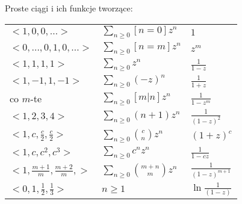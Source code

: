 \entry
Proste ciągi i ich funkcje tworzące:
\begin{tabular}{ | l | l | l |  }
    \hline
    $<1,0,0,\dots>$
      & $\sum_{n \geq 0}[n=0] z^n$
      & $1$ \\
    $<0,\dots, 0,1,0,\dots>$
      & $\sum_{n \geq 0}[n=m] z^n$
      & $z^m$ \\
    $<1,1,1,1>$
      & $\sum_{n \geq 0} z^n$
      & $\frac{1}{1-z}$ \\
    $<1,-1,1,-1>$
      & $\sum_{n \geq 0} (-z)^n$
      & $\frac{1}{1+z}$ \\
    co $m$-te
      & $\sum_{n \geq 0} [m | n]z^n$
      & $\frac{1}{1-z^m}$ \\
    $<1,2,3,4>$
      & $\sum_{n \geq 0} (n+1)z^n$
      & $\frac{1}{(1-z)^2}$ \\
    $<1,c,\frac{c}{2},\frac{c}{2}>$
      & $\sum_{n \geq 0} \binom{c}{n}z^n$
      & $(1+z)^c$ \\
    $<1,c,c^2,c^3>$
      & $\sum_{n \geq 0} c^n z^n$
      & $\frac{1}{1-cz}$ \\
    $<1,\frac{m+1}{m},\frac{m+2}{m},>$
      & $\sum_{n \geq 0} \binom{m+n}{m} z^n$
      & $ \frac{1}{(1-z)^{m+1}}$ \\
    $<0,1,\frac{1}{2},\frac{1}{3}>$
      & $n \geq 1$
      & $\ln \frac{1}{(1-z)}$ \\
    \hline
\end{tabular}
